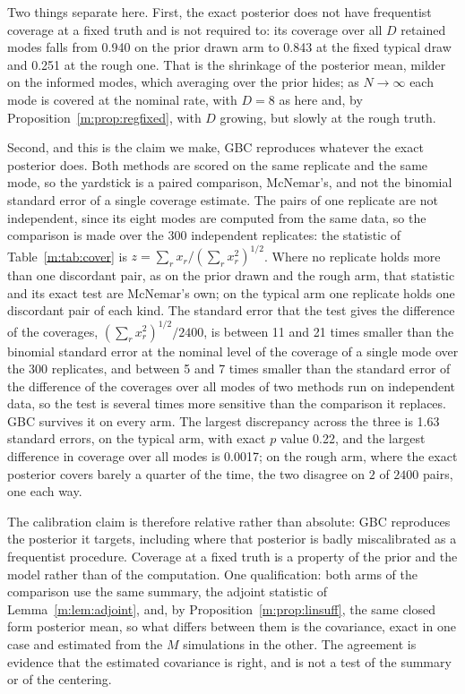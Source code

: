 Two things separate here. First, the exact posterior does not have frequentist coverage at a fixed truth and is not required to: its coverage over all $D$ retained modes falls from 0.940 on the prior drawn arm to 0.843 at the fixed typical draw and 0.251 at the rough one. That is the shrinkage of the posterior mean, milder on the informed modes, which averaging over the prior hides; as $N\to\infty$ each mode is covered at the nominal rate, with $D=8$ as here and, by Proposition~\ref{m:prop:regfixed}, with $D$ growing, but slowly at the rough truth.

Second, and this is the claim we make, GBC reproduces whatever the exact posterior does. Both methods are scored on the same replicate and the same mode, so the yardstick is a paired comparison, McNemar's, and not the binomial standard error of a single coverage estimate. The pairs of one replicate are not independent, since its eight modes are computed from the same data, so the comparison is made over the 300 independent replicates: the statistic of Table~\ref{m:tab:cover} is $z=\sum_rx_r/(\sum_rx_r^2)^{1/2}$. Where no replicate holds more than one discordant pair, as on the prior drawn and the rough arm, that statistic and its exact test are McNemar's own; on the typical arm one replicate holds one discordant pair of each kind. The standard error that the test gives the difference of the coverages, $(\sum_rx_r^2)^{1/2}/2400$, is between 11 and 21 times smaller than the binomial standard error at the nominal level of the coverage of a single mode over the 300 replicates, and between 5 and 7 times smaller than the standard error of the difference of the coverages over all modes of two methods run on independent data, so the test is several times more sensitive than the comparison it replaces. GBC survives it on every arm. The largest discrepancy across the three is 1.63 standard errors, on the typical arm, with exact $p$ value 0.22, and the largest difference in coverage over all modes is 0.0017; on the rough arm, where the exact posterior covers barely a quarter of the time, the two disagree on $2$ of $2400$ pairs, one each way.

The calibration claim is therefore relative rather than absolute: GBC reproduces the posterior it targets, including where that posterior is badly miscalibrated as a frequentist procedure. Coverage at a fixed truth is a property of the prior and the model rather than of the computation. One qualification: both arms of the comparison use the same summary, the adjoint statistic of Lemma~\ref{m:lem:adjoint}, and, by Proposition~\ref{m:prop:linsuff}, the same closed form posterior mean, so what differs between them is the covariance, exact in one case and estimated from the $M$ simulations in the other. The agreement is evidence that the estimated covariance is right, and is not a test of the summary or of the centering.
